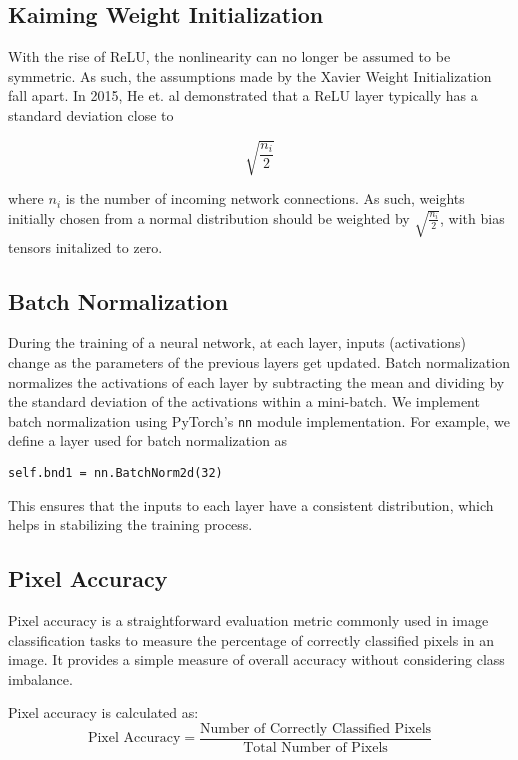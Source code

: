 \subsection*{Kaiming Weight Initialization}
With the rise of ReLU, the nonlinearity can no longer be assumed to be symmetric. As such, the assumptions made by the Xavier Weight Initialization fall apart. In 2015, He et. al demonstrated that a ReLU layer typically has a standard deviation close to

\begin{equation}
	\sqrt{\displaystyle\frac{n_{i}}{2}}
\end{equation}

where $n_i$ is the number of incoming network connections. As such, weights initially chosen from a normal distribution should be weighted by $\sqrt{\frac{n_{i}}{2}}$, with bias tensors initalized to zero.

\subsection*{Batch Normalization}
During the training of a neural network, at each layer, inputs (activations) change as the parameters of the previous layers get updated. Batch normalization normalizes the activations of each layer by subtracting the mean and dividing by the standard deviation of the activations within a mini-batch. We implement batch normalization using PyTorch's \texttt{nn} module implementation. For example, we define a layer used for batch normalization as

\begin{center}
	\texttt{self.bnd1 = nn.BatchNorm2d(32)}
\end{center}

This ensures that the inputs to each layer have a consistent distribution, which helps in stabilizing the training process.

\subsection*{Pixel Accuracy}
Pixel accuracy is a straightforward evaluation metric commonly used in image classification tasks to measure the percentage of correctly classified pixels in an image. It provides a simple measure of overall accuracy without considering class imbalance.

Pixel accuracy is calculated as:
\begin{equation}
	\text{Pixel Accuracy} = \frac{\text{Number of Correctly Classified Pixels}}{\text{Total Number of Pixels}}
\end{equation}

